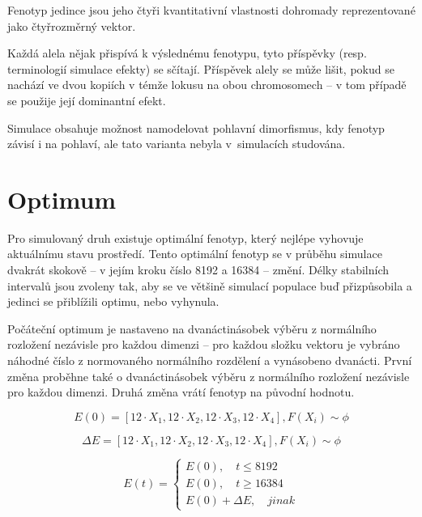 Fenotyp jedince jsou jeho čtyři kvantitativní vlastnosti dohromady reprezentované jako čtyřrozměrný vektor.

Každá alela nějak přispívá k výslednému fenotypu, tyto příspěvky (resp. terminologií simulace efekty) se sčítají.
Příspěvek alely se může lišit, pokud se nachází ve dvou kopiích v témže lokusu na obou chromosomech --
v tom případě se použije její dominantní efekt.

Simulace obsahuje možnost namodelovat pohlavní dimorfismus, kdy fenotyp závisí i na pohlaví, ale tato varianta nebyla
v~simulacích studována.

\section{Optimum}

Pro simulovaný druh existuje optimální fenotyp, který nejlépe vyhovuje aktuálnímu stavu prostředí.
Tento optimální fenotyp se v průběhu simulace dvakrát skokově -- v jejím kroku číslo 8192 a 16384 -- změní. Délky
stabilních intervalů jsou zvoleny tak, aby se ve většině simulací populace buď přizpůsobila a jedinci se přiblížili
optimu, nebo vyhynula.

Počáteční optimum je nastaveno na dvanáctinásobek výběru z normálního rozložení nezávisle pro každou dimenzi -- pro
každou složku vektoru je vybráno náhodné číslo z normovaného normálního rozdělení a vynásobeno dvanácti.
První změna proběhne také o dvanáctinásobek výběru z normálního rozložení nezávisle pro každou dimenzi. Druhá změna
vrátí fenotyp na původní hodnotu.

\begin{equation}
E(0) =  [12{\cdot}X_1, 12{\cdot}X_2, 12{\cdot}X_3, 12{\cdot}X_4], F(X_i) \sim \phi
\end{equation}

\begin{equation}
\Delta{E} = [12{\cdot}X_1, 12{\cdot}X_2, 12{\cdot}X_3, 12{\cdot}X_4], F(X_i) \sim \phi
\end{equation}

\begin{equation}
E(t) = \left \{
     \begin{array}{l} E(0), \quad t \leq 8192 \\
                      E(0), \quad t \geq 16384 \\
                      E(0) + \Delta{E}, \quad jinak
     \end{array} \right .
\end{equation}

